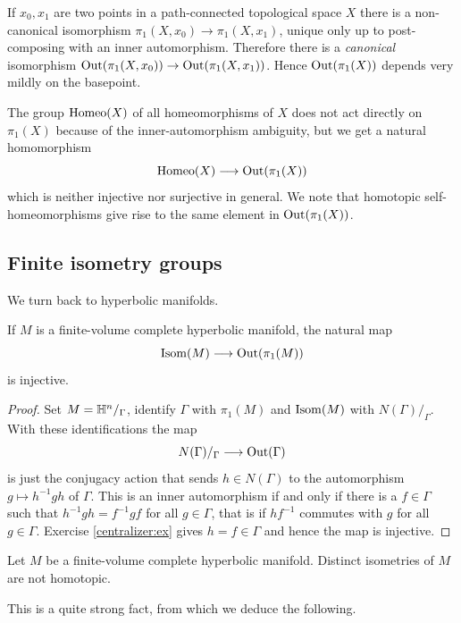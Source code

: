If $x_0, x_1$ are two points in a path-connected topological space $X$ there is a non-canonical isomorphism
$\pi_1(X,x_0) \to \pi_1(X,x_1)$, unique only up to post-composing with an inner automorphism. Therefore there is a \emph{canonical} isomorphism ${\rm Out}(\pi_1(X,x_0))\to{\rm Out}(\pi_1(X,x_1))$. Hence ${\rm Out}(\pi_1(X))$ depends very mildly on the basepoint.

The group ${\rm Homeo}(X)$ of all homeomorphisms of $X$ does not act directly on $\pi_1(X)$ because of the inner-automorphism ambiguity, but we get a natural homomorphism 
$${\rm Homeo} (X) \longrightarrow {\rm Out}(\pi_1(X))$$
which is neither injective nor surjective in general. We note that homotopic self-homeomorphisms give rise to the same element in ${\rm Out}(\pi_1(X))$.

\subsection{Finite isometry groups}
We turn back to hyperbolic manifolds. 

\begin{prop} \label{injective:prop}
If $M$ is a finite-volume complete hyperbolic manifold, the natural map 
$${\rm Isom}(M) \longrightarrow {\rm Out}(\pi_1(M))$$
is injective.
\end{prop}
\begin{proof}
Set $M=\mathbb{H}^n/_\Gamma$, identify $\Gamma$ with $\pi_1(M)$ and ${\rm Isom}(M)$ with $N(\Gamma)/_\Gamma$. With these identifications the map
$$N(\Gamma)/_\Gamma \longrightarrow {\rm Out}(\Gamma)$$
is just the conjugacy action that sends $h\in N(\Gamma)$ to the automorphism $g \mapsto h^{-1}gh$ of $\Gamma$. This is an inner automorphism if and only if there is a $f \in\Gamma$ such that $h^{-1}gh = f^{-1}gf$ for all $g\in\Gamma$, that is if $hf^{-1}$ commutes with $g$ for all $g\in\Gamma$. Exercise \ref{centralizer:ex} gives $h=f\in\Gamma$ and hence the map is injective.
\end{proof}

\begin{cor} \label{isometries:not:homotopic:cor}
Let $M$ be a finite-volume complete hyperbolic manifold. Distinct isometries of $M$ are not homotopic.
\end{cor}

This is a quite strong fact, from which we deduce the following.

